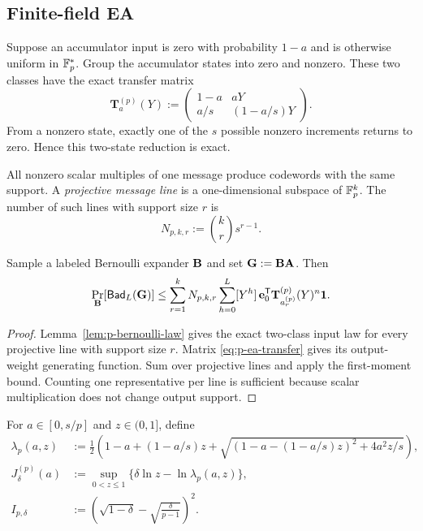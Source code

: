 \subsection{Finite-field EA}

Suppose an accumulator input is zero with probability $1-a$ and is otherwise
uniform in $\mathbb F_p^*$.  Group the accumulator states into zero and nonzero.
These two classes have the exact transfer matrix
\begin{equation}
 \mathbf T^{(p)}_a(Y):=
 \begin{pmatrix}
  1-a&aY\\
  a/s&(1-a/s)Y
 \end{pmatrix}.
 \label{eq:p-ea-transfer}
\end{equation}
From a nonzero state, exactly one of the $s$ possible nonzero increments
returns to zero.  Hence this two-state reduction is exact.

All nonzero scalar multiples of one message produce codewords with the same
support.  A \emph{projective message line} is a one-dimensional subspace of
$\mathbb F_p^k$.  The number of such lines with support size $r$ is
\begin{equation}
 N_{p,k,r}:=\binom{k}{r}s^{r-1}.
 \label{eq:projective-count}
\end{equation}

\begin{theorem}
\label{thm:p-ea-first-moment}
Sample a labeled Bernoulli expander $\mathbf B$ and set $\mathbf G:=\mathbf B\mathbf A$.  Then
\begin{equation}
 \Pr_{\mathbf B}[\mathsf{Bad}_L(\mathbf G)]\leq
 \sum_{r=1}^{k}N_{p,k,r}
 \sum_{h=0}^{L}[Y^h]\,
 \mathbf e_0^{\mathsf T}
 \mathbf T^{(p)}_{a^{(p)}_r}(Y)^n\mathbf 1.
 \label{eq:p-ea-first-moment}
\end{equation}
\end{theorem}

\begin{proof}
Lemma~\ref{lem:p-bernoulli-law} gives the exact two-class input law for every
projective line with support size $r$.  Matrix
\eqref{eq:p-ea-transfer} gives its output-weight generating function.  Sum
over projective lines and apply the first-moment bound.  Counting one
representative per line is sufficient because scalar multiplication does not
change output support.
\end{proof}

For $a\in[0,s/p]$ and $z\in(0,1]$, define
\begin{align}
 \lambda_p(a,z)
 &:=\frac12\left(1-a+(1-a/s)z
 +\sqrt{(1-a-(1-a/s)z)^2+4a^2z/s}\right),
 \label{eq:p-ea-spectral-radius}\\
 J^{(p)}_\delta(a)
 &:=\sup_{0<z\leq1}
 \{\delta\ln z-\ln\lambda_p(a,z)\},
 \label{eq:p-ea-rate-function}\\
 I_{p,\delta}
 &:=\left(\sqrt{1-\delta}
 -\sqrt{\frac{\delta}{p-1}}\right)^2.
 \label{eq:p-ea-sparse-rate}
\end{align}

